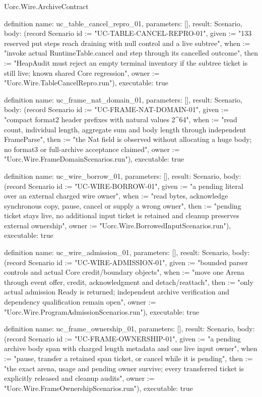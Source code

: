 \begin{lexlean}{Uorc.Wire.ArchiveContract}
\begin{semanticmodule}
definition{
  name: uc_table_cancel_repro_01,
  parameters: [],
  result: Scenario,
  body: (record Scenario {id := "UC-TABLE-CANCEL-REPRO-01", given := "133 reserved put steps reach draining with null control and a live subtree", when := "invoke actual RuntimeTable.cancel and step through its cancelled outcome", then := "HeapAudit must reject an empty terminal inventory if the subtree ticket is still live; known shared Core regression", owner := "Uorc.Wire.TableCancelRepro.run"}),
  executable: true
}

definition{
  name: uc_frame_nat_domain_01,
  parameters: [],
  result: Scenario,
  body: (record Scenario {id := "UC-FRAME-NAT-DOMAIN-01", given := "compact format2 header prefixes with natural values 2^64", when := "read count, individual length, aggregate sum and body length through independent FrameParse", then := "the Nat field is observed without allocating a huge body; no format3 or full-archive acceptance claimed", owner := "Uorc.Wire.FrameDomainScenarios.run"}),
  executable: true
}

definition{
  name: uc_wire_borrow_01,
  parameters: [],
  result: Scenario,
  body: (record Scenario {id := "UC-WIRE-BORROW-01", given := "a pending literal over an external charged wire owner", when := "read bytes, acknowledge synchronous copy, pause, cancel or supply a wrong owner", then := "pending ticket stays live, no additional input ticket is retained and cleanup preserves external ownership", owner := "Uorc.Wire.BorrowedInputScenarios.run"}),
  executable: true
}

definition{
  name: uc_wire_admission_01,
  parameters: [],
  result: Scenario,
  body: (record Scenario {id := "UC-WIRE-ADMISSION-01", given := "bounded parser controls and actual Core credit/boundary objects", when := "move one Arena through event offer, credit, acknowledgment and detach/reattach", then := "only actual admission Ready is returned; independent archive verification and dependency qualification remain open", owner := "Uorc.Wire.ProgramAdmissionScenarios.run"}),
  executable: true
}

definition{
  name: uc_frame_ownership_01,
  parameters: [],
  result: Scenario,
  body: (record Scenario {id := "UC-FRAME-OWNERSHIP-01", given := "a pending archive body span with charged length metadata and one live input owner", when := "pause, transfer a retained span ticket, or cancel while it is pending", then := "the exact arena, usage and pending owner survive; every transferred ticket is explicitly released and cleanup audits", owner := "Uorc.Wire.FrameOwnershipScenarios.run"}),
  executable: true
}
\end{semanticmodule}
\end{lexlean}
